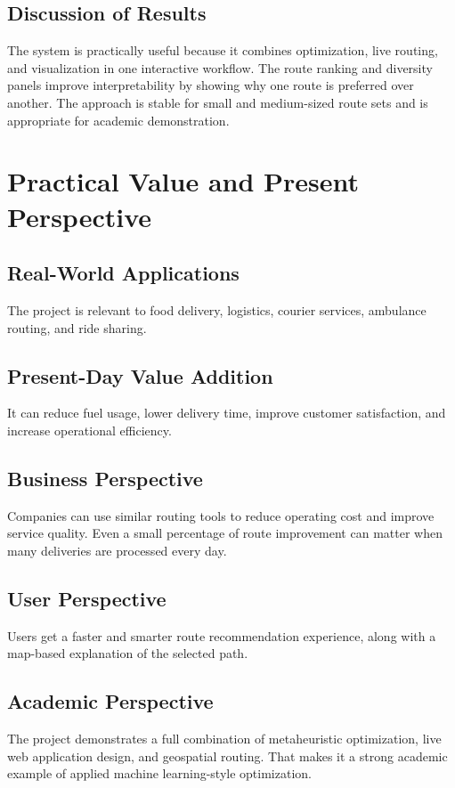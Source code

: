 \subsection{Discussion of Results}
The system is practically useful because it combines optimization, live routing, and visualization in one interactive workflow. The route ranking and diversity panels improve interpretability by showing why one route is preferred over another. The approach is stable for small and medium-sized route sets and is appropriate for academic demonstration.

\section{Practical Value and Present Perspective}
\subsection{Real-World Applications}
The project is relevant to food delivery, logistics, courier services, ambulance routing, and ride sharing.

\subsection{Present-Day Value Addition}
It can reduce fuel usage, lower delivery time, improve customer satisfaction, and increase operational efficiency.

\subsection{Business Perspective}
Companies can use similar routing tools to reduce operating cost and improve service quality. Even a small percentage of route improvement can matter when many deliveries are processed every day.

\subsection{User Perspective}
Users get a faster and smarter route recommendation experience, along with a map-based explanation of the selected path.

\subsection{Academic Perspective}
The project demonstrates a full combination of metaheuristic optimization, live web application design, and geospatial routing. That makes it a strong academic example of applied machine learning-style optimization.

